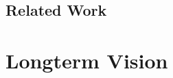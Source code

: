 \documentclass{llncs}
\begin{document}
{		%
		
		\subsection{Related Work}
			\label{ss:related-work}
			
%			
%			
%			
%		
	


	\section{Longterm Vision}
		\label{section-3}
		
}
\end{document}
